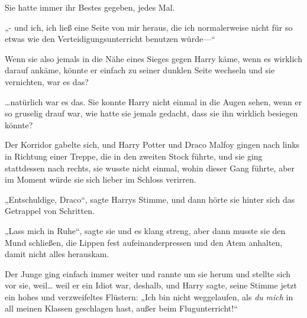Sie hatte immer ihr Bestes gegeben, jedes Mal.

„- und ich, ich ließ eine Seite von mir heraus, die ich normalerweise nicht für so etwas wie den Verteidigungsunterricht benutzen würde—“

Wenn sie also jemals in die Nähe eines Sieges gegen Harry käme, wenn es wirklich darauf ankäme, könnte er einfach zu seiner dunklen Seite wechseln und sie vernichten, war es das?

…natürlich war es das. Sie konnte Harry nicht einmal in die Augen sehen, wenn er so gruselig drauf war, wie hatte sie jemals gedacht, dass sie ihn wirklich besiegen könnte?

Der Korridor gabelte sich, und Harry Potter und Draco Malfoy gingen nach links in Richtung einer Treppe, die in den zweiten Stock führte, und sie ging stattdessen nach rechts, sie wusste nicht einmal, wohin dieser Gang führte, aber im Moment würde sie sich lieber im Schloss verirren.

„Entschuldige, Draco“, sagte Harrys Stimme, und dann hörte sie hinter sich das Getrappel von Schritten.

„Lass mich in Ruhe“, sagte sie und es klang streng, aber dann musste sie den Mund schließen, die Lippen fest aufeinanderpressen und den Atem anhalten, damit nicht alles herauskam.

Der Junge ging einfach immer weiter und rannte um sie herum und stellte sich vor sie, weil… weil er ein Idiot war, deshalb, und Harry sagte, seine Stimme jetzt ein hohes und verzweifeltes Flüstern: „Ich bin nicht weggelaufen, als \emph{du} \emph{mich} in all meinen Klassen geschlagen hast, außer beim Flugunterricht!“

